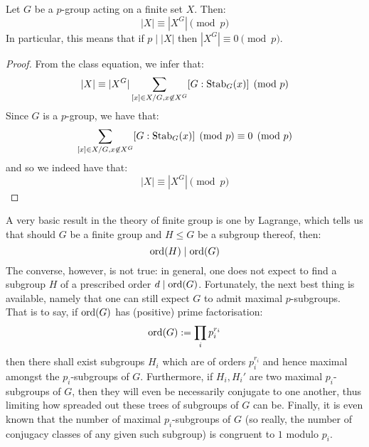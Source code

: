         \begin{lemma} \label{lemma: p_group_fixed_points}
            Let $G$ be a $p$-group acting on a finite set $X$. Then:
                $$|X| \equiv |X^G| \pmod{p}$$
            In particular, this means that if $p \mid |X|$ then $|X^G| \equiv 0 \pmod{p}$.
        \end{lemma}
            \begin{proof}
                From the class equation, we infer that:
                    $$|X| \equiv |X^G| \sum_{[x] \in X/G, x \not \in X^G} [G : \mathrm{Stab}_G(x)] \pmod{p}$$
                Since $G$ is a $p$-group, we have that:
                    $$\sum_{[x] \in X/G, x \not \in X^G} [G : \mathrm{Stab}_G(x)] \pmod{p} \equiv 0 \pmod{p}$$
                and so we indeed have that:
                    $$|X| \equiv |X^G| \pmod{p}$$
            \end{proof}
    
        A very basic result in the theory of finite group is one by Lagrange, which tells us that should $G$ be a finite group and $H \leq G$ be a subgroup thereof, then:
            $$\operatorname{ord}(H) \mid \operatorname{ord}(G)$$
        The converse, however, is not true: in general, one does not expect to find a subgroup $H$ of a prescribed order $d \mid \operatorname{ord}(G)$. Fortunately, the next best thing is available, namely that one can still expect $G$ to admit maximal $p$-subgroups. That is to say, if $\operatorname{ord}(G)$ has (positive) prime factorisation:
            $$\operatorname{ord}(G) := \prod_i p_i^{r_i}$$
        then there shall exist subgroups $H_i$ which are of orders $p_i^{r_i}$ and hence maximal amongst the $p_i$-subgroups of $G$. Furthermore, if $H_i, H_i'$ are two maximal $p_i$-subgroups of $G$, then they will even be necessarily conjugate to one another, thus limiting how spreaded out these trees of subgroups of $G$ can be. Finally, it is even known that the number of maximal $p_i$-subgroups of $G$ (so really, the number of conjugacy classes of any given such subgroup) is congruent to $1$ modulo $p_i$.

